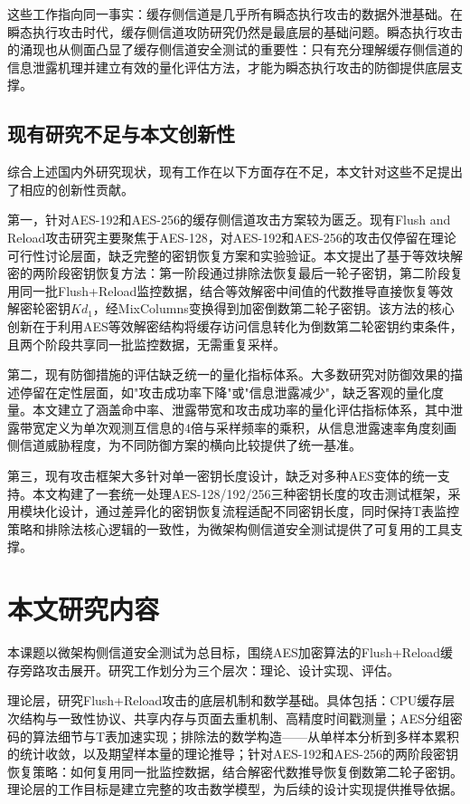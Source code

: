 这些工作指向同一事实：缓存侧信道是几乎所有瞬态执行攻击的数据外泄基础。在瞬态执行攻击时代，缓存侧信道攻防研究仍然是最底层的基础问题。瞬态执行攻击的涌现也从侧面凸显了缓存侧信道安全测试的重要性：只有充分理解缓存侧信道的信息泄露机理并建立有效的量化评估方法，才能为瞬态执行攻击的防御提供底层支撑。

\subsection{现有研究不足与本文创新性}

综合上述国内外研究现状，现有工作在以下方面存在不足，本文针对这些不足提出了相应的创新性贡献。

第一，针对AES-192和AES-256的缓存侧信道攻击方案较为匮乏。现有Flush and Reload攻击研究主要聚焦于AES-128，对AES-192和AES-256的攻击仅停留在理论可行性讨论层面，缺乏完整的密钥恢复方案和实验验证。本文提出了基于等效块解密的两阶段密钥恢复方法：第一阶段通过排除法恢复最后一轮子密钥，第二阶段复用同一批Flush+Reload监控数据，结合等效解密中间值的代数推导直接恢复等效解密轮密钥$Kd_1$，经MixColumns变换得到加密倒数第二轮子密钥。该方法的核心创新在于利用AES等效解密结构将缓存访问信息转化为倒数第二轮密钥约束条件，且两个阶段共享同一批监控数据，无需重复采样。

第二，现有防御措施的评估缺乏统一的量化指标体系。大多数研究对防御效果的描述停留在定性层面，如"攻击成功率下降"或"信息泄露减少"，缺乏客观的量化度量。本文建立了涵盖命中率、泄露带宽和攻击成功率的量化评估指标体系，其中泄露带宽定义为单次观测互信息的4倍与采样频率的乘积，从信息泄露速率角度刻画侧信道威胁程度，为不同防御方案的横向比较提供了统一基准。

第三，现有攻击框架大多针对单一密钥长度设计，缺乏对多种AES变体的统一支持。本文构建了一套统一处理AES-128/192/256三种密钥长度的攻击测试框架，采用模块化设计，通过差异化的密钥恢复流程适配不同密钥长度，同时保持T表监控策略和排除法核心逻辑的一致性，为微架构侧信道安全测试提供了可复用的工具支撑。

\section{本文研究内容}

本课题以微架构侧信道安全测试为总目标，围绕AES加密算法的Flush+Reload缓存旁路攻击展开。研究工作划分为三个层次：理论、设计实现、评估。

理论层，研究Flush+Reload攻击的底层机制和数学基础。具体包括：CPU缓存层次结构与一致性协议、共享内存与页面去重机制、高精度时间戳测量；AES分组密码的算法细节与T表加速实现；排除法的数学构造——从单样本分析到多样本累积的统计收敛，以及期望样本量的理论推导；针对AES-192和AES-256的两阶段密钥恢复策略：如何复用同一批监控数据，结合解密代数推导恢复倒数第二轮子密钥。理论层的工作目标是建立完整的攻击数学模型，为后续的设计实现提供推导依据。

